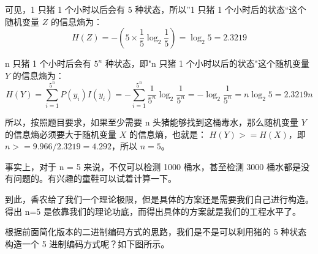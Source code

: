 \documentclass[12pt]{article}
\begin{document}
可见，1 只猪 1 个小时以后会有 5 种状态，所以”1 只猪 1 个小时后的状态“这个随机变量 $Z$ 的信息熵为：
$$H(Z) = -(5\times\frac{1}{5}\log_2{\frac{1}{5}}) = \log_2{5} = 2.3219$$

n 只猪 1 个小时后会有 $5^n$ 种状态，即"n 只猪 1 个小时以后的状态"这个随机变量 $Y$ 的信息熵为：
$$H(Y) = \sum_{i=1}^{5^n}P(y_i)I(y_i)=-\sum_{i=1}^{5^n}\frac{1}{5^n}\log_2{\frac{1}{5^n}} = -\log_2{\frac{1}{5^n}} = n\log_2{5} = 2.3219n$$

所以，按照题目要求，如果至少需要 n 头猪能够找到这桶毒水，那么随机变量 $Y$ 的信息熵必须要大于随机变量 $X$ 的信息熵，也就是：
$H(Y)>=H(X)$，即$n>=9.966/2.3219=4.292$，所以 $n=5$。

事实上，对于 n = 5 来说，不仅可以检测 1000 桶水，甚至检测 3000 桶水都是没有问题的。有兴趣的童鞋可以试着计算一下。

到此，香农给了我们一个理论极限，但是具体的方案还是需要我们自己进行构造。得出 n=5 是依靠我们的理论功底，而得出具体的方案就是我们的工程水平了。

根据前面简化版本的二进制编码方式的思路，我们是不是可以利用猪的 5 种状态构造一个 5 进制编码方式呢？如下图所示。
\end{document}
